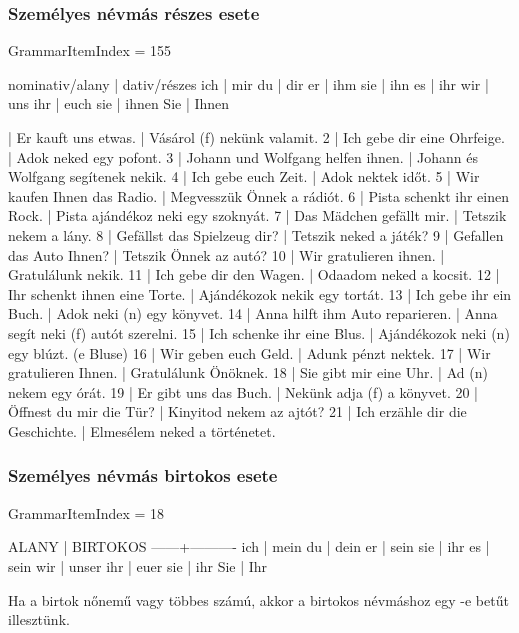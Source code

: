 \documentclass{article}
\newenvironment{desc}{\verbatim}{\endverbatim}
\newenvironment{exmp}{\verbatim}{\endverbatim}
\begin{document}
\subsubsection{Személyes névmás részes esete}

GrammarItemIndex = 155

\begin{desc}
nominativ/alany | dativ/részes 
ich             | mir 
du              | dir 
er              | ihm 
sie             | ihn
es              | ihr 
wir             | uns 
ihr             | euch 
sie             | ihnen  
Sie             | Ihnen 
\end{desc}

\begin{exmp}
1 | Er kauft uns etwas. | Vásárol (f) nekünk valamit.
2 | Ich gebe dir eine Ohrfeige. | Adok neked egy pofont.
3 | Johann und Wolfgang helfen ihnen. | Johann és Wolfgang segítenek nekik.
4 | Ich gebe euch Zeit. | Adok nektek időt.
5 | Wir kaufen Ihnen das Radio. | Megvesszük Önnek a rádiót.
6 | Pista schenkt ihr einen Rock. | Pista ajándékoz neki egy szoknyát.
7 | Das Mädchen gefällt mir. | Tetszik nekem a lány.
8 | Gefällst das Spielzeug dir? | Tetszik neked a játék?
9 | Gefallen das Auto Ihnen? | Tetszik Önnek az autó?
10 | Wir gratulieren ihnen. | Gratulálunk nekik.
11 | Ich gebe dir den Wagen. | Odaadom neked a kocsit.
12 | Ihr schenkt ihnen eine Torte. | Ajándékozok nekik egy tortát.
13 | Ich gebe ihr ein Buch. | Adok neki (n) egy könyvet.
14 | Anna hilft ihm Auto reparieren. | Anna segít neki (f) autót szerelni.
15 | Ich schenke ihr eine Blus. | Ajándékozok neki (n) egy blúzt. (e Bluse)
16 | Wir geben euch Geld. | Adunk pénzt nektek.
17 | Wir gratulieren Ihnen. | Gratulálunk Önöknek.
18 | Sie gibt mir eine Uhr. | Ad (n) nekem egy órát.
19 | Er gibt uns das Buch. | Nekünk adja (f) a könyvet.
20 | Öffnest du mir die Tür? | Kinyitod nekem az ajtót?
21 | Ich erzähle dir die Geschichte. | Elmesélem neked a történetet.
\end{exmp}

\subsubsection{Személyes névmás birtokos esete}

GrammarItemIndex = 18

\begin{desc}
ALANY | BIRTOKOS 
------+----------
ich   | mein
du    | dein
er    | sein
sie   | ihr
es    | sein
wir   | unser
ihr   | euer
sie   | ihr
Sie   | Ihr

Ha a birtok nőnemű vagy többes számú, akkor a birtokos névmáshoz
egy -e betűt illesztünk.
\end{desc}
\end{document}

